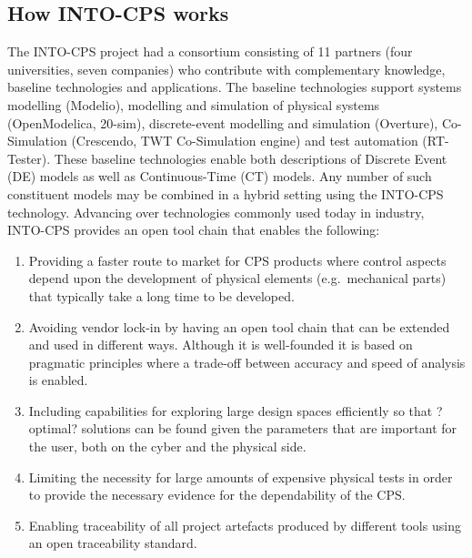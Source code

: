 \subsection{How INTO-CPS works}

The INTO-CPS project had a consortium consisting of 11 partners (four universities, seven companies) who contribute with complementary knowledge, baseline technologies and applications. The baseline technologies support systems modelling (Modelio), modelling and simulation of physical systems (OpenModelica, 20-sim), discrete-event modelling and simulation (Overture), Co-Simulation (Crescendo, TWT Co-Simulation engine) and test automation (RT-Tester). These baseline technologies enable both descriptions of Discrete Event (DE) models as well as Continuous-Time (CT) models. Any number of such constituent models may be combined in a hybrid setting using the INTO-CPS technology. Advancing over technologies commonly used today in industry, INTO-CPS provides an open tool chain that enables the following:

\begin{enumerate}
\item Providing a faster route to market for CPS products where control aspects depend upon the development of physical elements (e.g.\ mechanical parts) that typically take a long time to be developed.
\item Avoiding vendor lock-in by having an open tool chain that can be extended and used in different ways. Although it is well-founded it is based on pragmatic principles where a trade-off between accuracy and speed of analysis is enabled.
\item Including capabilities for exploring large design spaces efficiently so that ?optimal? solutions can be found given the parameters that are important for the user, both on the cyber and the physical side.
\item Limiting the necessity for large amounts of expensive physical tests in order to provide the necessary evidence for the dependability of the CPS.
\item Enabling traceability of all project artefacts produced by different tools using an open traceability standard.
\end{enumerate}

